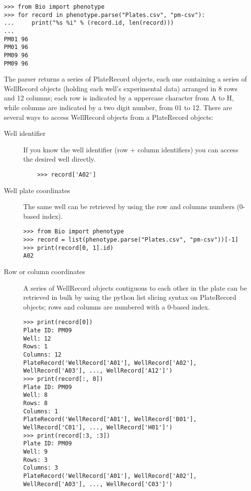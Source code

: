 \begin{verbatim}
>>> from Bio import phenotype
>>> for record in phenotype.parse("Plates.csv", "pm-csv"):
...     print("%s %i" % (record.id, len(record)))
...
PM01 96
PM01 96
PM09 96
PM09 96
\end{verbatim}

The parser returns a series of PlateRecord objects, each one containing a series of WellRecord objects
(holding each well's experimental data) arranged in 8 rows and 12 columns; each row is indicated by
a uppercase character from A to H, while columns are indicated by a two digit number, from 01 to 12.
There are several ways to access WellRecord objects from a PlateRecord objects:

\begin{description}
  \item[Well identifier]
    If you know the well identifier (row + column identifiers) you can access the desired well directly.
    \begin{verbatim}
    >>> record['A02']
    \end{verbatim}

  \item[Well plate coordinates]
    The same well can be retrieved by using the row and columns numbers (0-based index).

\begin{verbatim}
>>> from Bio import phenotype
>>> record = list(phenotype.parse("Plates.csv", "pm-csv"))[-1]
>>> print(record[0, 1].id)
A02
\end{verbatim}

  \item[Row or column coordinates]
    A series of WellRecord objects contiguous to each other in the plate can be retrieved in bulk by
    using the python list slicing syntax on PlateRecord objects; rows and columns are numbered with
    a 0-based index.

\begin{verbatim}
>>> print(record[0])
Plate ID: PM09
Well: 12
Rows: 1
Columns: 12
PlateRecord('WellRecord['A01'], WellRecord['A02'], WellRecord['A03'], ..., WellRecord['A12']')
>>> print(record[:, 0])
Plate ID: PM09
Well: 8
Rows: 8
Columns: 1
PlateRecord('WellRecord['A01'], WellRecord['B01'], WellRecord['C01'], ..., WellRecord['H01']')
>>> print(record[:3, :3])
Plate ID: PM09
Well: 9
Rows: 3
Columns: 3
PlateRecord('WellRecord['A01'], WellRecord['A02'], WellRecord['A03'], ..., WellRecord['C03']')
\end{verbatim}

\end{description}

